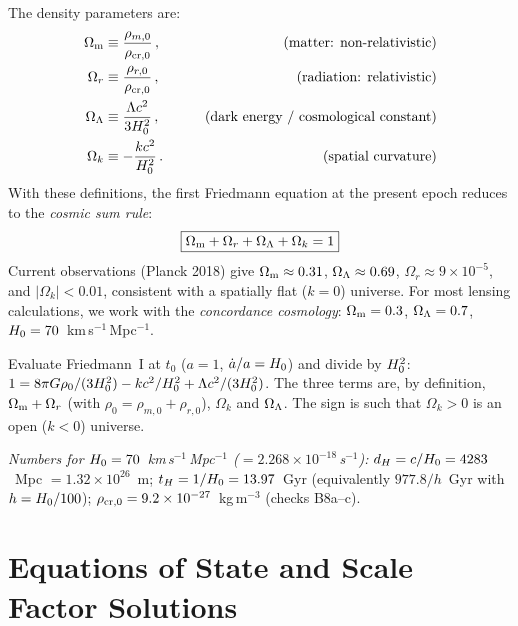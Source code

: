 The density parameters are:
\begin{align}
    \Omega_{\mathrm{m}} &\equiv \frac{\rho_{m,0}}{\rho_{\mathrm{cr},0}} \,,
    \qquad &\text{(matter: non-relativistic)} \nonumber \\
    \Omega_r &\equiv \frac{\rho_{r,0}}{\rho_{\mathrm{cr},0}} \,,
    \qquad &\text{(radiation: relativistic)} \nonumber \\
    \Omega_{\Lambda} &\equiv \frac{\Lambda c^2}{3H_0^2} \,,
    \qquad &\text{(dark energy / cosmological constant)} \nonumber \\
    \Omega_k &\equiv -\frac{kc^2}{H_0^2} \,.
    \qquad &\text{(spatial curvature)}
    \label{eq:density_parameters}
\end{align}
With these definitions, the first Friedmann equation at the present
epoch reduces to the \emph{cosmic sum rule}:
\begin{equation}
    \boxed{
    \Omega_{\mathrm{m}} + \Omega_r + \Omega_{\Lambda} + \Omega_k = 1
    }
    \label{eq:cosmic_sum}
\end{equation}
Current observations (Planck 2018) give
$\Omega_{\mathrm{m}} \approx 0.31$, $\Omega_{\Lambda} \approx 0.69$,
$\Omega_r \approx 9 \times 10^{-5}$, and $|\Omega_k| < 0.01$,
consistent with a spatially flat ($k = 0$) universe.  For most
lensing calculations, we work with the \emph{concordance
cosmology}: $\Omega_{\mathrm{m}} = 0.3$, $\Omega_{\Lambda} = 0.7$, $H_0 = 70$~km\,s$^{-1}$\,Mpc$^{-1}$.


\begin{derivation}
Evaluate Friedmann~I at $t_0$ ($a = 1$, $\dot a/a = H_0$) and divide by
$H_0^2$:
$1 = 8\pi G\rho_0/(3H_0^2) - kc^2/H_0^2
+ \Lambda c^2/(3H_0^2)$.  The three terms are, by definition,
$\Omega_{\mathrm{m}} + \Omega_r$ (with $\rho_0 = \rho_{m,0} + \rho_{r,0}$),
$\Omega_k$ and $\Omega_{\Lambda}$.  The sign is such that $\Omega_k > 0$ is an open
($k<0$) universe.

\textit{Numbers for $H_0 = 70$~km\,s$^{-1}$\,Mpc$^{-1}$
($= 2.268\times10^{-18}$\,s$^{-1}$):}
$d_H = c/H_0 = 4283$~Mpc $= 1.32\times10^{26}$~m;
$t_H = 1/H_0 = 13.97$~Gyr (equivalently $977.8/h$~Gyr with
$h = H_0/100$); $\rho_{\rm cr,0} = 9.2\times10^{-27}$~kg\,m$^{-3}$
(checks B8a--c).
\end{derivation}

\section{Equations of State and Scale Factor Solutions}
\label{sec:equations_of_state}


